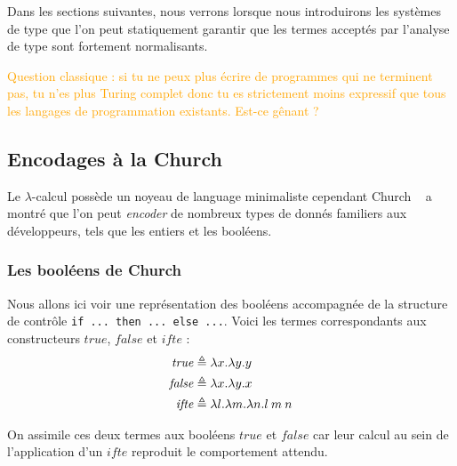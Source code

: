 \documentclass {article}
\theoremstyle{definition}
\theoremstyle{remark}
\newcommand{\attention}[1]{\textcolor{orange}{#1}}
\begin{document}
Dans les sections suivantes, nous verrons lorsque nous introduirons
les systèmes de type que l'on peut statiquement garantir que les
termes acceptés par l'analyse de type sont fortement normalisants.

\attention{Question classique : si tu ne peux plus écrire de
  programmes qui ne terminent pas, tu n'es plus Turing complet donc tu
  es strictement moins expressif que tous les langages de
  programmation existants. Est-ce gênant ?}



\subsection{Encodages à la Church}

Le $\lambda$-calcul possède un noyeau de language minimaliste
cependant Church ~\citet{church:lambda-calcul} a montré que l'on peut
\emph{encoder} de nombreux types de donnés familiers aux développeurs, tels que
les entiers et les booléens.


\subsubsection{Les booléens de Church}

\newcommand{\True}{\ensuremath{\mathit{true}}}
\newcommand{\False}{\ensuremath{\mathit{false}}}
\newcommand{\Ifte}{\ensuremath{\mathit{ifte}}}

Nous allons ici voir une représentation des booléens accompagnée de la 
structure de contrôle \texttt{if ... then ... else ...}.
Voici les termes correspondants aux constructeurs \True{}, \False{} et 
\Ifte{} :
\begin{align*}
  \True &\triangleq  \Lam{x}{\Lam{y}{\Var{y}}} \\
  \False &\triangleq \Lam{x}{\Lam{y}{\Var{x}}} \\
  \Ifte &\triangleq \Lam{l}{\Lam{m}{\Lam{n}{\App{\Var{l}}{\App{\Var{m}}{\Var{n}}}}}}  \\
\end{align*}

On assimile ces deux termes aux booléens \True{} et \False{} car leur calcul au sein
de l'application d'un \Ifte{} reproduit le comportement attendu.
\end{document}
